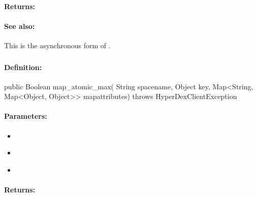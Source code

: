 \paragraph{Returns:}


\paragraph{See also:}  This is the asynchronous form of .

\pagebreak
\subsubsection{}
\label{api:java:map_atomic_max}


\paragraph{Definition:}
\begin{javacode}
public Boolean map_atomic_max(
        String spacename,
        Object key,
        Map<String, Map<Object, Object>> mapattributes) throws HyperDexClientException
\end{javacode}

\paragraph{Parameters:}
\begin{itemize}[noitemsep]
\item {}\\

\item {}\\

\item {}\\

\end{itemize}

\paragraph{Returns:}


